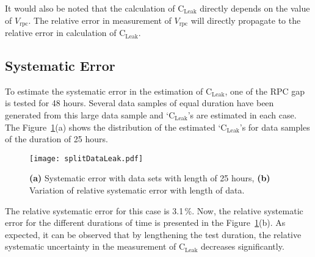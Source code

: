 It would also be noted that the calculation of $\textrm{C}_{\textrm{Leak}}$
directly depends on the value of $V_{\textrm{rpc}}$. The relative error in
measurement of $V_{\textrm{rpc}}$ will directly propagate to the relative error
in calculation of $\textrm{C}_{\textrm{Leak}}$.

\subsection{Systematic Error}
To estimate the systematic error in the estimation of
$\textrm{C}_{\textrm{Leak}}$, one of the RPC gap is tested for 48 hours. Several
data samples of equal duration have been generated from this large data sample
and `$\textrm{C}_{\textrm{Leak}}$'s are estimated in each case. The
Figure~\ref{fig:systematic}(a) shows the distribution of the estimated
`$\textrm{C}_{\textrm{Leak}}$'s for data samples of the duration of 25 hours.
\begin{figure}
  \centering
  \texttt{[image: splitDataLeak.pdf]}
  \caption{\textbf{(a)} Systematic error with data sets with length of 25 hours, \textbf{(b)} Variation of relative systematic error with length of data.}
  \label{fig:systematic}
\end{figure}
The relative systematic error for this case is 3.1\,\%. Now, the relative
systematic error for the different durations of time is presented in the
Figure~\ref{fig:systematic}(b). As expected, it can be observed that by
lengthening the test duration, the relative systematic uncertainty in the
measurement of $\textrm{C}_{\textrm{Leak}}$ decreases significantly.

